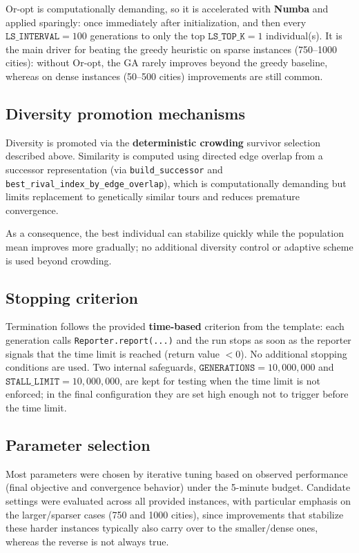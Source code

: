 \documentclass[a4paper,10pt]{article}
\begin{document}
Or-opt is computationally demanding, so it is accelerated with \textbf{Numba} and applied sparingly: once
immediately after initialization, and then every $\texttt{LS\_INTERVAL}=100$ generations to only the top
$\texttt{LS\_TOP\_K}=1$ individual(s). It is the main driver for beating the greedy heuristic on sparse instances
(750--1000 cities): without Or-opt, the GA rarely improves beyond the greedy baseline, whereas on dense instances
(50--500 cities) improvements are still common.


\subsection{Diversity promotion mechanisms}

Diversity is promoted via the \textbf{deterministic crowding} survivor selection described above. Similarity is
computed using directed edge overlap from a successor representation (via \texttt{build\_successor} and
\texttt{best\_rival\_index\_by\_edge\_overlap}), which is computationally demanding but limits replacement to
genetically similar tours and reduces premature convergence.

As a consequence, the best individual can stabilize quickly while the population mean improves more gradually;
no additional diversity control or adaptive scheme is used beyond crowding.


\subsection{Stopping criterion}

Termination follows the provided \textbf{time-based} criterion from the template: each generation calls
\texttt{Reporter.report(...)} and the run stops as soon as the reporter signals that the time limit is reached
(return value $<0$). No additional stopping conditions are used. Two internal safeguards,
$\texttt{GENERATIONS}=10{,}000{,}000$ and $\texttt{STALL\_LIMIT}=10{,}000{,}000$, are kept for testing when the
time limit is not enforced; in the final configuration they are set high enough not to trigger before the time
limit.


\subsection{Parameter selection}

Most parameters were chosen by iterative tuning based on observed performance (final objective and convergence
behavior) under the 5-minute budget. Candidate settings were evaluated across all provided instances, with
particular emphasis on the larger/sparser cases (750 and 1000 cities), since improvements that stabilize these
harder instances typically also carry over to the smaller/dense ones, whereas the reverse is not always true.
\end{document}
